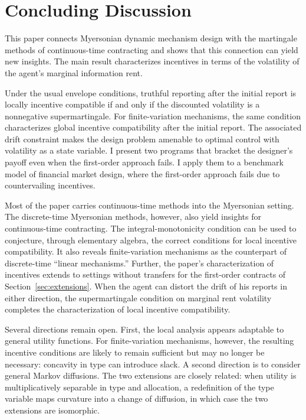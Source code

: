 \documentclass[12pt]{article}
\begin{document}
\section{Concluding Discussion}\label{sec:conclusion}

This paper connects Myersonian dynamic mechanism design with the
martingale methods of continuous-time contracting and shows that this connection can yield new insights. The main result
characterizes incentives in terms of the volatility of the agent's
marginal information rent.

Under the usual envelope conditions, truthful reporting after the
initial report is locally incentive compatible if and only if the
discounted volatility is a nonnegative supermartingale. For
finite-variation mechanisms, the same condition characterizes global
incentive compatibility after the initial report. The associated drift
constraint makes the design problem amenable to optimal control with
volatility as a state variable. I present two programs that bracket the designer's
payoff even when the first-order approach fails. I apply them to
a benchmark model of financial market design, where the first-order approach fails due to countervailing
incentives.

Most of the paper carries continuous-time methods into the
Myersonian setting.
The discrete-time Myersonian methods, however, also yield insights for
continuous-time contracting. The integral-monotonicity condition
can be used to conjecture, through elementary algebra, the correct conditions for local
incentive compatibility. It also
reveals finite-variation mechanisms as the counterpart of
discrete-time ``linear mechanisms.'' Further, the paper's characterization of incentives extends to settings without transfers for the first-order contracts of Section~\ref{sec:extensions}. When the agent can distort the drift of his reports in either direction,
the supermartingale condition on marginal rent volatility completes
the characterization of local incentive compatibility.

Several directions remain open. First, the local analysis appears
adaptable to general utility functions. For finite-variation mechanisms,
however, the resulting incentive conditions are likely to remain
sufficient but may no longer be necessary: concavity in type can
introduce slack. A second direction is to consider general Markov
diffusions. The two extensions are closely related:  when
utility is multiplicatively separable in type and allocation, a
redefinition of the type variable maps curvature into a change of
diffusion, in which case the two extensions are isomorphic. 
\end{document}
